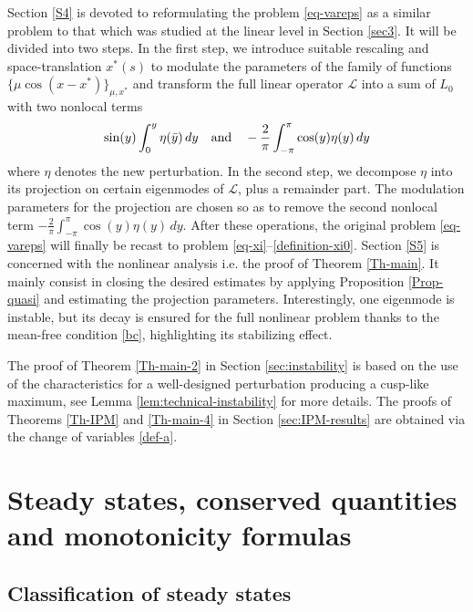 \documentclass[12pt]{amsart}
\numberwithin{equation}{section}
\def\and{\quad{\rm and}\quad}
\numberwithin{equation}{section}
\begin{document}
 \medskip
 
Section \ref{S4} is devoted to reformulating the problem \eqref{eq-vareps}  as a similar problem to that which was studied at the linear level  in Section \ref{sec3}.   It will be divided into two steps.  In the first step,  we introduce suitable  rescaling  and   space-translation $x^*(s)$ to  modulate the parameters of the family of functions $\{\mu \cos(x-x^*)\}_{\mu,x^*}$ and 
transform the full linear operator $\mathcal{L}$ into a sum  of $L_0$ with two nonlocal terms
$$  \sin(y)\int_0^y \eta(\bar y)\,dy\and -\frac{2}{\pi}\int_{-\pi}^{\pi}\cos(y)\eta(y)\,dy$$
where $\eta$ denotes the new perturbation. In the second step,  we decompose $\eta$ into its projection on certain eigenmodes of $\mathcal{L}$, plus a remainder part. The modulation parameters for the projection are chosen so as to remove the second nonlocal term $-\frac{2}{\pi}\int_{-\pi}^{\pi}\cos(y)\eta(y)\,dy$. After these operations,   the  original problem \eqref{eq-vareps} will finally be recast to problem \eqref{eq-xi}--\eqref{definition-xi0}.
Section \ref{S5} is concerned with the nonlinear analysis i.e.  the proof of Theorem \ref{Th-main}. It mainly consist in closing the desired estimates by applying  Proposition \ref{Prop-quasi} and estimating the projection parameters. Interestingly, one eigenmode is instable, but its decay is ensured for the full nonlinear problem thanks to the mean-free condition \eqref{bc}, highlighting its stabilizing effect.

\medskip

 The proof of Theorem \ref{Th-main-2} in Section \ref{sec:instability} is based on the use of the characteristics for a well-designed perturbation producing a cusp-like maximum, see Lemma \ref{lem:technical-instability} for more details. The proofs of Theorems \ref{Th-IPM} and \ref{Th-main-4} in Section \ref{sec:IPM-results} are obtained via the change of variables \eqref{def-a}.
 
 
 
 
 
 
 
 


\section{Steady states, conserved quantities and monotonicity formulas}\label{S2}

\subsection{Classification of steady states}
\end{document}
